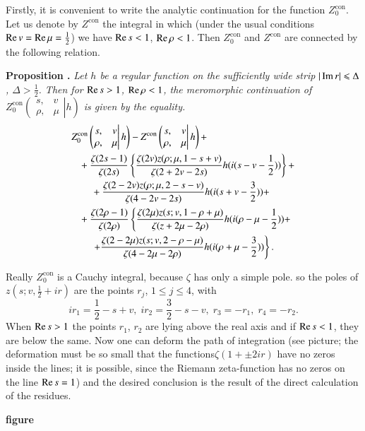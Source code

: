 Firstly, it is convenient to write the analytic continuation for the function $Z^{\text{con}}_0$. Let us denote by $Z^{\text{con}}$ the integral in which (under the usual conditions $\operatorname{Re} v = \operatorname{Re} \mu =\frac{1}{2}$) we have $\operatorname{Re} s < 1$, $\operatorname{Re} \rho <1$. Then $Z^{\text{con}}_0$ and $Z^{\text{con}}$ are connected by the following relation.

\medskip
\noindent
{\bfseries Proposition .\label{art7-prop6}}
\textit{Let $h$ be a regular function on the sufficiently wide strip $|\operatorname{Im} r | \leqslant \Delta$, $\Delta > \frac{1}{2}$. Then for $\operatorname{Re} s > 1$, $\operatorname{Re} \rho < 1$, the meromorphic continuation of $Z^{\text{con}}_0 
\left( 
\left. 
\begin{matrix}
s, & v\\
\rho, &\mu
\end{matrix}
\right| h
\right)$ is given by the equality.} 
\begin{align}
&Z^{\text{con}}_0 
\left( 
\left. 
\begin{matrix}
s, & v\\
\rho, &\mu
\end{matrix}
\right| h
\right) - Z^{\text{con}}
\left( 
\left. 
\begin{matrix}
s, & v\\
\rho, &\mu
\end{matrix}
\right| h
\right) + \label{art7-eq4.3}\\
& ~~~+ \frac{\zeta(2s-1)}{\zeta(2s)} \left\{\frac{\zeta(2v) z (\rho; \mu, 1 -s + v)}{\zeta(2+ 2 v - 2s)} h (i(s-v-\frac{1}{2})) \right\}  +
\notag \\
& \qquad + \frac{\zeta (2-2v) z (\rho ;\mu, 2 - s -v)}{\zeta(4-2v-2s)} h(i (s+ v - \frac{3}{2})) + \notag \\
& ~~~  +\frac{\zeta (2 \rho -1)}{\zeta (2\rho)}  \left\{ \frac{\zeta (2\mu) z (s; v , 1 - \rho + \mu)}{\zeta (z+ 2 \mu - 2 \rho)} h (i(\rho - \mu -\frac{1}{2})) + \right.\notag\\
& \qquad \left. + \frac{\zeta(2-2\mu) z (s; v, 2 - \rho -\mu)}{\zeta(4-2\mu - 2 \rho)} h (i (\rho + \mu - \frac{3}{2})) \right\}. \notag
\end{align}

Really $Z^{\text{con}}_0$ is a Cauchy integral, because $\zeta$ has only a simple pole. so the poles of $z(s; v, \frac{1}{2} + ir)$ are the points $r_j$, $1\leqslant j \leqslant 4$, with
$$
ir_1 = \frac{1}{2} - s+ v, \;  ir_2 =\frac{3}{2} - s - v, \; r_3 = - r_1, \; r_4 = -r_2.
$$
When $\operatorname{Re} s > 1$ the points $r_1$, $r_2$ are lying above the real axis and if $\operatorname{Re} s < 1$, they are below the same. Now one can deform the path of integration (see picture; the deformation must be so small that the functions\pageoriginale  $\zeta( 1+ \pm 2 ir)$ have no zeros inside the lines; it is possible, since the Riemann zeta-function has no zeros on the line $\operatorname{Re} s =1$) and the desired conclusion is the result of the direct calculation of the residues. 
\begin{center}
\textbf{\bf figure}
\end{center}

